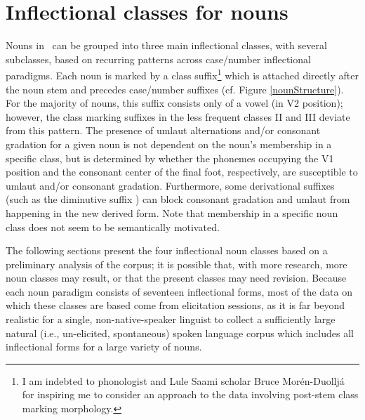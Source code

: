 

\section{Inflectional classes for nouns}\label{nounClasses}
Nouns in \PS\ can be grouped into three main inflectional classes, with several subclasses, based on recurring patterns across case/number inflectional paradigms. Each noun is marked by a class suffix\footnote{I am indebted to phonologist and Lule Saami scholar Bruce Morén-Duolljá for inspiring me to consider an approach to the data involving post-stem class marking morphology.} 
which is attached directly after the noun stem and precedes case/number suffixes (cf. Figure \vref{nounStructure}). For the majority of nouns, this suffix consists only of a vowel (in V2 position); however, the class marking suffixes in the less frequent classes II and III deviate from this pattern. 
The presence of umlaut alternations and/or consonant gradation for a given noun is not dependent on the noun’s membership in a specific class, but is determined by whether the phonemes occupying the V1 position and the consonant center of the final foot, respectively, are susceptible to umlaut and/or consonant gradation. Furthermore, some derivational suffixes (such as the diminutive suffix ) can block consonant gradation and umlaut from happening in the new derived form. 
Note that membership in a specific noun class does not seem to be semantically motivated. 

The following sections present the four inflectional noun classes based on a preliminary analysis of the corpus; it is possible that, with more research, more noun classes may result, or that the present classes may need revision. Because each noun paradigm consists of seventeen inflectional forms, most of the data on which these classes are based come from elicitation sessions, as it is far beyond realistic for a single, non-native-speaker linguist to collect a sufficiently large natural (i.e., un-elicited, spontaneous) spoken language corpus which includes all inflectional forms for a large variety of nouns.

